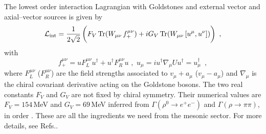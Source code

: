 The lowest order interaction Lagrangian with Goldstones and external
vector and axial--vector sources  is given by
\begin{equation}
{\cal L}_{\rm int} = \frac{1}{2\sqrt{2}} \, \biggl( F_V \, {\rm Tr} (
W_{\mu \nu} \, f_+^{\mu \nu} ) + i G_V \, {\rm Tr} (W_{\mu \nu} \, [
u^\mu , u^\nu] ) \biggr)
\, \, \, ,
\label{ltint}
\end{equation}
with
\begin{equation}
f_+^{\mu \nu}  = u F_L^{\mu \nu} u^\dagger + u^\dagger F_R^{\mu \nu} u
\, \, , \, \, u_\mu = i u^\dagger \nabla_\mu U u^\dagger = u_\mu^\dagger
\, \, \, ,
\label{fmnu}
\end{equation}
where $F_L^{\mu \nu}$ ($F_R^{\mu \nu}$) are the field strengths
associated to $v_\mu +a _\mu$ ($v_\mu - a _\mu$) and $\nabla_\mu $ is
the chiral covariant derivative acting on the Goldstone bosons. The
two real constants $F_V$ and $G_V$ are not fixed by chiral
symmetry. Their numerical values are $F_V = 154 \,$MeV and $G_V = 69
\,$MeV inferred from $\Gamma (\rho^0 \to e^+ e^-)$ and
$\Gamma (\rho \to \pi \pi)$, in order \cite{reso}. These are all the
ingredients we need from the mesonic sector. For more details, see
Refs.\cite{reso,reso1}.


